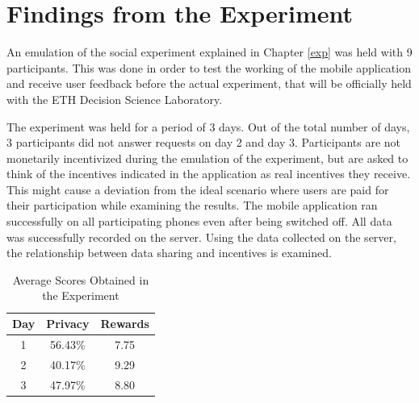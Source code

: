 \section{Findings from the Experiment}


An emulation of the social experiment explained in Chapter \ref{exp} was held with 9 participants. This was done in order to test the working of the mobile application and receive user feedback before the actual experiment, that will be officially held with the ETH Decision Science Laboratory.

The experiment was held for a period of 3 days. Out of the total number of days, 3 participants did not answer requests on day 2 and day 3. Participants are not monetarily incentivized during the emulation of the experiment, but are asked to think of the incentives indicated in the application as real incentives they receive. This might cause a deviation from the ideal scenario where users are paid for their participation while examining the results. The mobile application ran successfully on all participating phones even after being switched off. All data was successfully recorded on the server. Using the data collected on the server, the relationship between data sharing and incentives is examined.

\begin{table}[h!]
  \centering
  \caption{Average Scores Obtained in the Experiment}
  \label{tab:score}
  \begin{tabular}{ccc}
    \toprule
    Day&Privacy&Rewards \\
    \midrule
	1&56.43\%&7.75\\
	2&40.17\%&9.29\\
	3&47.97\%&8.80\\
\bottomrule
  \end{tabular}
\end{table} 

